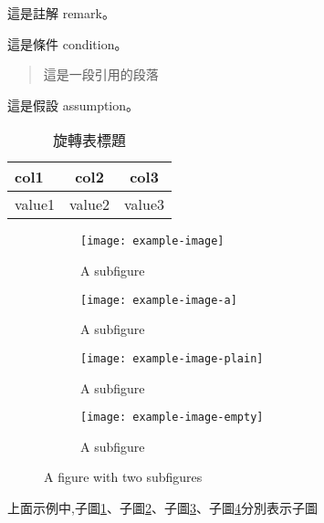 \documentclass[writingLanguage=chinese,
    addPageTitle=on,
    addDeclaration=on,
    addMUSTlog=off,
    addFigTOC=on,   
    addTabTOC=on,
    refIndent=off,
    printMod=off,
]{.def/must}
\begin{document}
\begin{remark}
這是註解 remark。
\end{remark}



\begin{condition}
這是條件 condition。
\end{condition}

 \begin{quote}
     這是一段引用的段落
 \end{quote}

\begin{assumption}
這是假設 assumption。
\end{assumption}



\begin{sidewaystable}[!htp]
    \setlength{\tabcolsep}{10mm}
    \centering
    \caption{旋轉表標題}
    \begin{tabular}[l]{lcc}
    \toprule
        col1 & col2 & col3 \\
    \midrule
        value1 & value2 & value3 \\
    \bottomrule
    \end{tabular}
\end{sidewaystable}


\begin{figure}[H]
	\centering
	\begin{subfigure}{0.49\textwidth}
	  	\centering
            \texttt{[image: example-image]}
		\caption{A subfigure}
		\label{fig:sub1}
	\end{subfigure}
	\hfill
	\begin{subfigure}{.49\textwidth}
		\centering
            \texttt{[image: example-image-a]}
		\caption{A subfigure}
	  	\label{fig:sub2}
	\end{subfigure}
        \newline
	\begin{subfigure}{.49\textwidth}
		\centering
            \texttt{[image: example-image-plain]}
		\caption{A subfigure}
		\label{fig:sub3}
	\end{subfigure}
	\begin{subfigure}{.49\textwidth}
		\centering
            \texttt{[image: example-image-empty]}
		\caption{A subfigure}
		\label{fig:sub4}
	\end{subfigure}
	\caption{A figure with two subfigures}
	\label{fig:sub}
\end{figure}
上面示例中,子圖\ref{fig:sub1}、子圖\ref{fig:sub2}、子圖\ref{fig:sub3}、子圖\ref{fig:sub4}分別表示子圖
\end{document}
